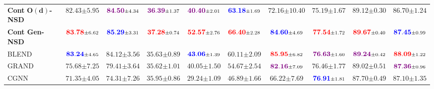 \documentclass{article}
\newcommand{\first}[1]{\mathbf{\textcolor{red}{#1}}}
\newcommand{\second}[1]{\mathbf{\textcolor{blue}{#1}}}
\newcommand{\third}[1]{\mathbf{\textcolor{violet}{#1}}}
\begin{document}
\begin{table*}[t]
{\begin{tabular}{l ccccccccc}
         \textbf{Cont} $\mathbf{O(d)}$\textbf{-NSD} &
         $82.43 {\scriptstyle \pm 5.95}$ &
         $\third{84.50} {\scriptstyle \pm 4.34}$ &
         $\third{36.39} {\scriptstyle \pm 1.37}$ & 
         $\third{40.40} {\scriptstyle \pm 2.01}$ & 
         $\second{63.18} {\scriptstyle \pm 1.69}$ &
         $72.16 {\scriptstyle \pm 10.40}$ & 
         $75.19 {\scriptstyle \pm 1.67}$ &
         $89.12 {\scriptstyle \pm 0.30}$ &
         $86.70 {\scriptstyle \pm 1.24}$\\
         
         \textbf{Cont Gen-NSD} &
         $\first{83.78} {\scriptstyle \pm 6.62}$ &
         $\second{85.29} {\scriptstyle \pm 3.31}$ &
         $\first{37.28} {\scriptstyle \pm 0.74}$ & 
         $\first{52.57} {\scriptstyle \pm 2.76}$ & 
         $\first{66.40} {\scriptstyle \pm 2.28}$ &
         $\second{84.60} {\scriptstyle \pm 4.69}$ & 
         $\first{77.54} {\scriptstyle \pm 1.72}$ &
         $\first{89.67} {\scriptstyle \pm 0.40}$ &
         $\second{87.45} {\scriptstyle \pm 0.99}$ \\  
         
         \midrule
         
        BLEND &
          $\second{83.24} {\scriptstyle \pm 4.65}$ &
          $84.12 {\scriptstyle \pm 3.56}$ &
          $35.63 {\scriptstyle \pm 0.89}$ & 
          $\second{43.06} {\scriptstyle \pm 1.39}$ & 
          $60.11 {\scriptstyle \pm 2.09}$ &
         $\first{85.95} {\scriptstyle \pm 6.82}$ & 
         $\third{76.63} {\scriptstyle \pm 1.60}$ &
         $\third{89.24} {\scriptstyle \pm 0.42}$ &
         $\first{88.09} {\scriptstyle \pm 1.22}$ \\ 
         
         GRAND &
          $75.68 {\scriptstyle \pm 7.25}$ &
          $79.41 {\scriptstyle \pm 3.64}$ &
          $35.62 {\scriptstyle \pm 1.01}$ & 
          $40.05 {\scriptstyle \pm 1.50}$ & 
          $54.67 {\scriptstyle \pm 2.54}$ &
          $\third{82.16} {\scriptstyle \pm 7.09}$ & 
         $76.46 {\scriptstyle \pm 1.77}$ &
         $89.02 {\scriptstyle \pm 0.51}$ &
         $\third{87.36} {\scriptstyle \pm 0.96}$\\
        
         CGNN &
          $71.35 {\scriptstyle \pm 4.05}$ &
          $74.31 {\scriptstyle \pm 7.26}$ &
          $35.95 {\scriptstyle \pm 0.86}$ & 
          $29.24 {\scriptstyle \pm 1.09}$ & 
          $46.89 {\scriptstyle \pm 1.66}$ &
          $66.22 {\scriptstyle \pm 7.69}$ & 
          $\second{76.91} {\scriptstyle \pm 1.81}$ &
          $87.70 {\scriptstyle \pm 0.49}$ &
          $87.10 {\scriptstyle \pm 1.35}$\\
         
         \bottomrule
         
    \end{tabular}
    }
    \label{tab:cont_table}
\end{table*} 
\end{document}
